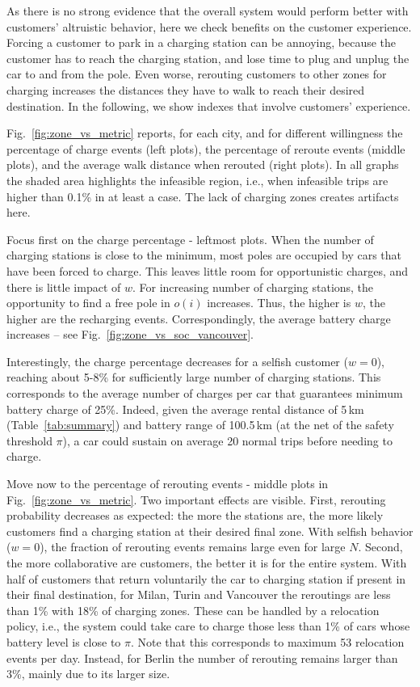 As there is no strong evidence that the overall system would perform better with customers' altruistic behavior, here we check benefits on the customer experience. Forcing a customer to park in a charging station can be annoying, because the customer has to reach the charging station, and lose time to plug and unplug the car to and from the pole. Even worse, rerouting customers to other zones for charging increases the distances they have to walk to reach their desired destination.
In the following, we show indexes that involve customers' experience.

Fig.~\ref{fig:zone_vs_metric} reports, for each city, and for different willingness the percentage of charge events (left plots), the percentage of reroute events (middle plots), and the average walk distance when rerouted (right plots). In all graphs the shaded area highlights the infeasible region, i.e., when infeasible trips are higher than 0.1\% in at least a case. The lack of charging zones creates artifacts here. 

Focus first on the charge percentage - leftmost plots. When the number of charging stations is close to the minimum, most poles are occupied by cars that have been forced to charge. This leaves little room for opportunistic charges, and there is little impact of $w$. For increasing number of charging stations, the opportunity to find a free pole in $o(i)$ increases. Thus, the higher is $w$, the higher are the recharging events. Correspondingly, the average battery charge increases -- see Fig.~\ref{fig:zone_vs_soc_vancouver}.

Interestingly, the charge percentage decreases for a selfish customer ($w=0$), reaching about 5-8\% for sufficiently large number of charging stations. This corresponds to the average number of charges per car that guarantees minimum battery charge of 25\%. Indeed, given the average rental distance of 5\,km (Table~\ref{tab:summary}) and battery range of 100.5\,km (at the net of the safety threshold $\pi$), a car could sustain on average 20 normal trips before needing to charge.  

Move now to the percentage of rerouting events - middle plots in Fig.~\ref{fig:zone_vs_metric}. Two important effects are visible. First, 
rerouting probability decreases as expected: the more the stations are, the more likely customers find a charging station at their desired final zone. 
With selfish behavior ($w=0$), the fraction of rerouting events remains large even for large $N$.
Second, the more collaborative are customers, the better it is for the entire system. With half of customers that return voluntarily the car to charging station if present in their final destination, for Milan, Turin and Vancouver the reroutings are less than 1\% with 18\% of charging zones. These can be handled by a relocation policy, i.e., the system could take care to charge those less than 1\% of cars whose battery level is close to $\pi$. Note that this corresponds to maximum 53 relocation events per day. Instead, for Berlin the number of rerouting remains larger than 3\%, mainly due to its larger size.



